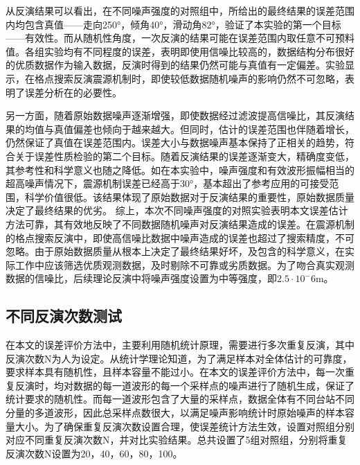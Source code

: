 从反演结果可以看出，在不同噪声强度的对照组中，所给出的最终结果的误差范围内均包含真值——走向250°，倾角40°，滑动角82°，验证了本实验的第一个目标——有效性。而从随机性角度，一次反演的结果可能在误差范围内取任意不可预料值。各组实验均有不同程度的误差，表明即使用信噪比较高的，数据结构分布很好的优质数据作为输入数据，反演时得到的结果仍然可能与真值有一定偏差。实验显示，在格点搜索反演震源机制时，即使较低数据随机噪声的影响仍然不可忽略，表明了误差分析在的必要性。

另一方面，随着原始数据噪声逐渐增强，即使数据经过滤波提高信噪比，其反演结果的均值与真值偏差也倾向于越来越大。但同时，估计的误差范围也伴随着增长，仍然保证了真值在误差范围内。误差大小与数据噪声基本保持了正相关的趋势，符合关于误差性质检验的第二个目标。随着反演结果的误差逐渐变大，精确度变低，其参考性和科学意义也随之降低。如在本实验中，噪声强度和有效波形振幅相当的超高噪声情况下，震源机制误差已经高于30°，基本超出了参考应用的可接受范围，科学价值很低。该结果体现了原始数据对于反演结果的重要性，原始数据质量决定了最终结果的优劣。 综上，本次不同噪声强度的对照实验表明本文误差估计方法可靠，其有效地反映了不同数据随机噪声对反演结果造成的误差。在震源机制的格点搜索反演中，即使高信噪比数据中噪声造成的误差也超过了搜索精度，不可忽略。由于原始数据质量从根本上决定了最终结果好坏，及包含的科学意义，在实际工作中应该筛选优质观测数据，及时剔除不可靠或劣质数据。为了吻合真实观测数据的信噪比，后续理论反演中将噪声强度设置为中等强度，即$2.5\cdot10^-{6}$m。

\subsection{不同反演次数测试}
在本文的误差评价方法中，主要利用随机统计原理，需要进行多次重复反演，其中反演次数N为人为设定。从统计学理论知道，为了满足样本对全体估计的可靠度，要求样本具有随机性，且样本容量不能过小。在本文的误差评价方法中，每一次重复反演时，均对数据的每一道波形的每一个采样点的噪声进行了随机生成，保证了统计要求的随机性。而每一道波形包含了大量的采样点，数据全体有不同台站不同分量的多道波形，因此总采样点数很大，以满足噪声影响统计时原始噪声的样本容量大小。为了确保重复反演次数设置合理，使误差统计方法生效，设置对照组分别对应不同重复反演次数N，并对比实验结果。总共设置了5组对照组，分别将重复反演次数N设置为20，40，60，80，100。

